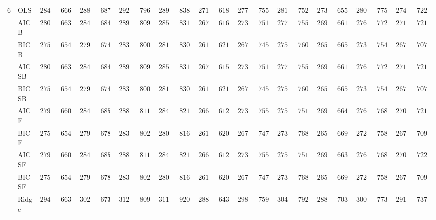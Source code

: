 \begin{tabular}{ll|ll|llllll|llllll|llllll}
6 & OLS  & $2843.38$ & $666.76$ & $2886.06$ & $687.68$ & $2929.16$ & $796.89$ & $2893.56$ & $838.09$ & $2716.47$ & $618.83$ & $2775.74$ & $755.44$ & $2811.58$ & $752.39$ & $2732.13$ & $655.64$ & $2807.69$ & $775.50$ & $2748.06$ & $722.34$ \\
 & AIC B  & $2801.08$ & $663.10$ & $2847.87$ & $684.89$ & $2898.66$ & $809.57$ & $2857.72$ & $831.74$ & $2673.40$ & $616.50$ & $2738.28$ & $751.61$ & $2775.52$ & $755.02$ & $2699.04$ & $661.89$ & $2765.32$ & $772.39$ & $2714.70$ & $721.42$ \\
 & BIC B  & $2750.01$ & $654.65$ & $2796.68$ & $674.66$ & $2839.12$ & $800.56$ & $2819.68$ & $830.54$ & $2613.25$ & $621.72$ & $2675.47$ & $745.26$ & $2756.36$ & $760.71$ & $2656.22$ & $665.34$ & $2732.05$ & $754.82$ & $2677.76$ & $707.14$ \\
 & AIC SB  & $2801.08$ & $663.10$ & $2847.87$ & $684.89$ & $2898.66$ & $809.57$ & $2857.72$ & $831.74$ & $2674.60$ & $615.79$ & $2738.28$ & $751.61$ & $2775.52$ & $755.02$ & $2699.04$ & $661.89$ & $2765.32$ & $772.39$ & $2714.70$ & $721.42$ \\
 & BIC SB  & $2750.01$ & $654.65$ & $2796.68$ & $674.66$ & $2839.12$ & $800.56$ & $2819.68$ & $830.54$ & $2613.25$ & $621.72$ & $2675.73$ & $745.46$ & $2756.36$ & $760.71$ & $2656.22$ & $665.34$ & $2732.05$ & $754.82$ & $2677.76$ & $707.14$ \\
 & AIC F  & $2798.82$ & $660.67$ & $2847.51$ & $685.20$ & $2889.62$ & $811.86$ & $2848.40$ & $821.62$ & $2669.40$ & $612.51$ & $2730.16$ & $755.99$ & $2753.01$ & $751.17$ & $2696.02$ & $664.00$ & $2761.24$ & $768.80$ & $2700.88$ & $721.60$ \\
 & BIC F  & $2750.01$ & $654.65$ & $2797.16$ & $678.32$ & $2835.04$ & $802.82$ & $2807.31$ & $816.88$ & $2611.69$ & $620.24$ & $2672.55$ & $747.10$ & $2731.89$ & $768.30$ & $2654.23$ & $669.02$ & $2727.40$ & $758.85$ & $2671.09$ & $709.06$ \\
 & AIC SF  & $2798.82$ & $660.67$ & $2847.51$ & $685.20$ & $2889.46$ & $811.96$ & $2848.40$ & $821.62$ & $2669.40$ & $612.51$ & $2730.60$ & $755.93$ & $2751.38$ & $751.00$ & $2695.72$ & $663.91$ & $2761.24$ & $768.80$ & $2702.28$ & $722.86$ \\
 & BIC SF  & $2750.01$ & $654.65$ & $2797.16$ & $678.32$ & $2835.04$ & $802.82$ & $2807.31$ & $816.88$ & $2611.69$ & $620.24$ & $2672.55$ & $747.10$ & $2731.89$ & $768.30$ & $2654.23$ & $669.02$ & $2727.40$ & $758.85$ & $2671.09$ & $709.06$ \\
 & Ridge  & $2949.87$ & $663.09$ & $3028.22$ & $673.07$ & $3120.98$ & $809.59$ & $3111.91$ & $920.28$ & $2881.42$ & $643.36$ & $2980.23$ & $759.95$ & $3049.81$ & $792.40$ & $2888.26$ & $703.58$ & $3005.56$ & $773.77$ & $2916.64$ & $737.94$ \\

\end{tabular}

